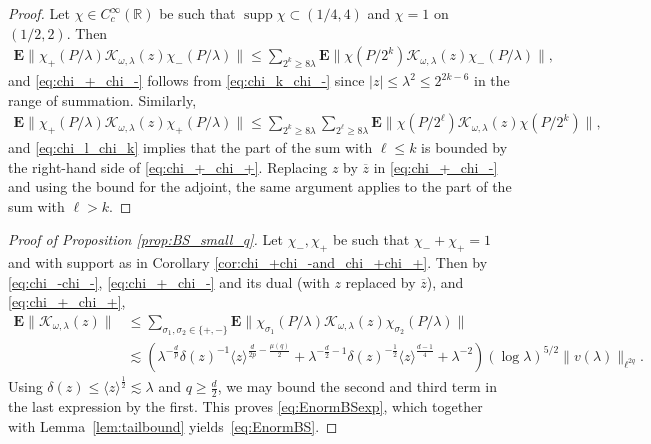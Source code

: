 \documentclass[12pt,reqno]{amsart}
\theoremstyle{definition}
\theoremstyle{remark}
\numberwithin{equation}{section}
\newcommand{\1}{\mathbbm{1}}
\newcommand{\R}{\mathbb{R}}
\DeclareMathOperator{\supp}{supp}
\begin{document}
\begin{proof}
Let $\chi\in C_c^{\infty}(\R)$ be such that $\supp\chi\subset (1/4,4)$ and $\chi=1$ on $(1/2,2)$.
Then 
\begin{align*}
\mathbf{E}\|\chi_+(P/\lambda)\mathcal{K}_{\omega,\lambda}(z)\chi_-(P/\lambda)\|\leq \sum_{2^{k}\geq 8\lambda}\mathbf{E}\|\chi(P/2^k)\mathcal{K}_{\omega,\lambda}(z)\chi_-(P/\lambda)\|,
\end{align*}    
and \eqref{eq:chi_+_chi_-} follows from  \eqref{eq:chi_k_chi_-} since $|z|\leq \lambda^2\leq 2^{2k-6}$ in the range of summation.
Similarly, 
\begin{align*}
\mathbf{E}\|\chi_+(P/\lambda)\mathcal{K}_{\omega,\lambda}(z)\chi_+(P/\lambda)\|\leq \sum_{2^{k}\geq 8\lambda}\sum_{2^{\ell}\geq 8\lambda}\mathbf{E}\|\chi(P/2^\ell)\mathcal{K}_{\omega,\lambda}(z)\chi(P/2^k)\|,    
\end{align*}
and \eqref{eq:chi_l_chi_k} implies that the part of the sum with $\ell\leq k$ is bounded by the right-hand side of \eqref{eq:chi_+_chi_+}. Replacing $z$ by $\overline{z}$ in \eqref{eq:chi_+_chi_-} and using the bound for the adjoint, the same argument applies to the part of the sum with $\ell>k$.
\end{proof}




\begin{proof}[Proof of Proposition \ref{prop:BS_small_q}]
Let $\chi_-,\chi_+$ be such that $\chi_-+\chi_+=1$ and with support as in Corollary \ref{cor:chi_+chi_-and_chi_+chi_+}. Then by \eqref{eq:chi_-chi_-}, \eqref{eq:chi_+_chi_-} and its dual (with $z$ replaced by $\overline{z}$), and \eqref{eq:chi_+_chi_+},
\begin{align*}
\mathbf{E}\|\mathcal{K}_{\omega,\lambda}(z)\|
&\leq \sum_{\sigma_1,\sigma_2\in\{+,-\}}\mathbf{E}\|\chi_{\sigma_1}(P/\lambda)\mathcal{K}_{\omega,\lambda}(z)\chi_{\sigma_2}(P/\lambda)\|
\\
 &\lesssim
 (\lambda^{-\frac{d}{p}}  \delta(z)^{-1} \langle z\rangle^{\frac{d}{2p}-\frac{\mu(q)}{2}}
 +\lambda^{-\frac{d}{2}-1}\delta(z)^{-\frac{1}{2}} \langle z\rangle^{\frac{d-1}{4}}+\lambda^{-2})
 (\log\lambda)^{5/2}\|v(\lambda)\|_{\ell^{2q}}.
\end{align*}
Using $\delta(z)\leq \langle z\rangle^{\frac{1}{2}}\lesssim\lambda$ and $q\geq \frac{d}{2}$, we may bound the second and third term in the last expression by the first.
This proves \eqref{eq:EnormBSexp}, which 
together with Lemma~\ref{lem:tailbound} yields~\eqref{eq:EnormBS}.
\end{proof}
\end{document}
